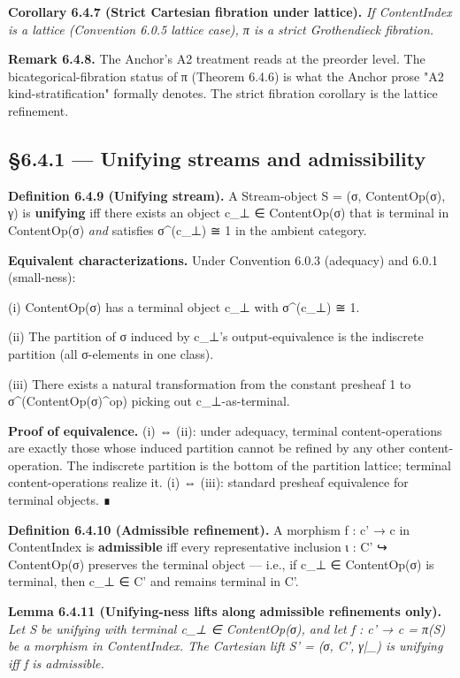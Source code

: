 \documentclass[11pt, openany]{book}
\begin{document}
\textbf{Corollary 6.4.7 (Strict Cartesian fibration under lattice).} \textit{If ContentIndex is a lattice (Convention 6.0.5 lattice case), π is a strict Grothendieck fibration.}

\textbf{Remark 6.4.8.} The Anchor's A2 treatment reads at the preorder level. The bicategorical-fibration status of π (Theorem 6.4.6) is what the Anchor prose "A2 kind-stratification" formally denotes. The strict fibration corollary is the lattice refinement.

\subsection{§6.4.1 --- Unifying streams and admissibility}

\textbf{Definition 6.4.9 (Unifying stream).} A Stream-object S = (σ, ContentOp(σ), γ) is \textbf{unifying} iff there exists an object c\_\allowbreak{}⊥ ∈ ContentOp(σ) that is terminal in ContentOp(σ) \textit{and} satisfies σ\textasciicircum{}(c\_\allowbreak{}⊥) ≅ 1 in the ambient category.

\textbf{Equivalent characterizations.} Under Convention 6.0.3 (adequacy) and 6.0.1 (small-ness):

(i) ContentOp(σ) has a terminal object c\_\allowbreak{}⊥ with σ\textasciicircum{}(c\_\allowbreak{}⊥) ≅ 1.

(ii) The partition of σ induced by c\_\allowbreak{}⊥'s output-equivalence is the indiscrete partition (all σ-elements in one class).

(iii) There exists a natural transformation from the constant presheaf 1 to σ\textasciicircum{}(ContentOp(σ)\textasciicircum{}op) picking out c\_\allowbreak{}⊥-as-terminal.

\textbf{Proof of equivalence.} (i) ⇔ (ii): under adequacy, terminal content-operations are exactly those whose induced partition cannot be refined by any other content-operation. The indiscrete partition is the bottom of the partition lattice; terminal content-operations realize it. (i) ⇔ (iii): standard presheaf equivalence for terminal objects. ∎

\textbf{Definition 6.4.10 (Admissible refinement).} A morphism f : c' → c in ContentIndex is \textbf{admissible} iff every representative inclusion ι : C' ↪ ContentOp(σ) preserves the terminal object --- i.e., if c\_\allowbreak{}⊥ ∈ ContentOp(σ) is terminal, then c\_\allowbreak{}⊥ ∈ C' and remains terminal in C'.

\textbf{Lemma 6.4.11 (Unifying-ness lifts along admissible refinements only).} \textit{Let S be unifying with terminal c\_\allowbreak{}⊥ ∈ ContentOp(σ), and let f : c' → c = π(S) be a morphism in ContentIndex. The Cartesian lift S' = (σ, C', γ|\_) is unifying iff f is admissible.}
\end{document}
